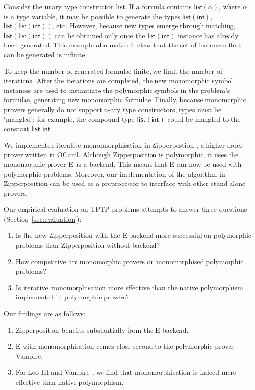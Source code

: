 \documentclass[]{ceurart}
\newcommand\ty[1]{\textsf{#1}}
\begin{document}
Consider the unary type constructor \ty{list}. If a formula contains $\ty{list}(\alpha)$, where $\alpha$ is a type variable, it may be possible to generate the types $\ty{list}(\ty{int})$, $\ty{list}(\ty{list}(\ty{int}))$, etc. However, because new types emerge through matching, $\ty{list}(\ty{list}(\ty{int}))$ can be obtained only once the $\ty{list}(\ty{int})$ instance has already been generated. This example also makes it clear that the set of instances that can be generated is infinite.

To keep the number of generated formulae finite, we limit the number of iterations. After the iterations are completed, the new monomorphic symbol instances are used to instantiate the polymorphic symbols in the problem's formulae, generating new monomorphic formulae. Finally, because monomorphic provers generally do not support $n$-ary type constructors, types must be `mangled'; for example, the compound type $\ty{list}(\ty{int})$ could be mangled to the constant $\ty{list\_int}$.

We implemented iterative monormorphisation in Zipperpostion \cite{zipp}, a higher order prover written in OCaml. Although Zipperposition is polymorphic, it uses the monomorphic prover E \cite{e} as a backend. This means that E can now be used with polymorphic problems. Moreover, our implementation of the algorithm in Zipperposition can be used as a preprocessor to interface with other stand-alone provers.

Our empirical evaluation on TPTP \cite{tptp} problems attempts to answer three questions (Section~\ref{sec:evaluation}):
%
\begin{enumerate}
\item Is the new Zipperposition with the E backend more successful on polymorphic problems than Zipperposition without backend?

\item How competitive are monomorphic provers on monomorphised polymorphic problems?

\item Is iterative monomorphisation more effective than the native polymorphism implemented in polymorphic provers?
\end{enumerate}

Our findings are as follows:
%
\begin{enumerate}
\item Zipperposition benefits substantially from the E backend.

\item E with monomorphisation comes close second to the polymorphic prover Vampire.

\item For Leo-III \cite{leo-iii} and Vampire \cite{vamp}, we find that monomorphisation is indeed more effective than native polymorphism.
\end{enumerate}
\end{document}
